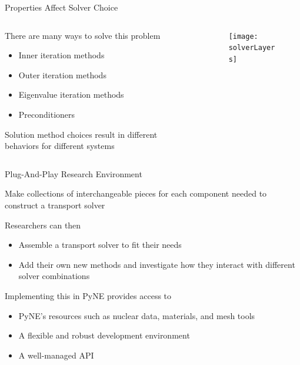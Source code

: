 \documentclass[xcolor=x11names,compress]{beamer}
\renewcommand{\(}{\begin{columns}}
\renewcommand{\)}{\end{columns}}
\newcommand{\<}[1]{\begin{column}{#1}}
\renewcommand{\>}{\end{column}}
\begin{document}
\begin{frame}{Properties Affect Solver Choice}

    \begin{columns}
    \begin{column}{0.45\textwidth}
        There are many ways to \textcolor{dgreen}{solve} this problem
        \begin{itemize}
        \item Inner iteration methods
        \item Outer iteration methods
        \item Eigenvalue iteration methods
        \item Preconditioners
        \end{itemize}
    
        \textcolor{dgreen}{Solution} method choices result in different
        behaviors for different systems
  	\end{column}
 	\begin{column}{0.45\textwidth}
 	   \begin{center}
 	   \begin{figure}
 	   \texttt{[image: solverLayers]}
       \end{figure}
 	   \end{center}
  	\end{column}
	\end{columns}
	
\end{frame}

\begin{frame}{Plug-And-Play Research Environment}

    Make collections of \textcolor{dgreen}{interchangeable pieces} for each component
    needed to construct a transport solver
    
    \vspace*{1em}
    Researchers can then 
    \begin{itemize}
    \item \textcolor{dgreen}{Assemble} a transport solver to fit their needs
    \item \textcolor{dgreen}{Add} their own new methods and investigate how 
    they interact with different solver combinations
    \end{itemize}

    \vspace*{1em}
    Implementing this in PyNE provides access to 
    \begin{itemize}
    \item PyNE's \textcolor{dgreen}{resources} such as nuclear data, materials, 
    and mesh tools  
    \item A flexible and robust \textcolor{dgreen}{development environment} 
    \item A well-managed \textcolor{dgreen}{API}
    \end{itemize}

\end{frame}
\end{document}

